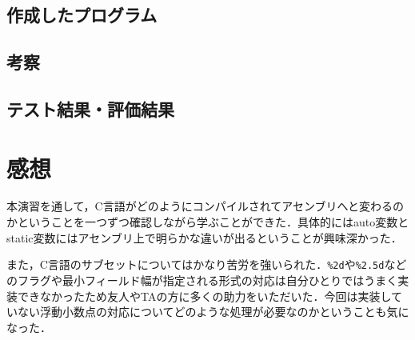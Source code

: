 \documentclass[a4j,11pt]{jarticle}
\begin{document}
  \subsection{作成したプログラム}
  \subsection{考察}
  \subsection{テスト結果・評価結果}

\section{感想}
本演習を通して，C言語がどのようにコンパイルされてアセンブリへと変わるのかということを一つずつ確認しながら学ぶことができた．具体的にはauto変数とstatic変数にはアセンブリ上で明らかな違いが出るということが興味深かった．

また，C言語のサブセットについてはかなり苦労を強いられた．\verb|%2d|や\verb|%2.5d|などのフラグや最小フィールド幅が指定される形式の対応は自分ひとりではうまく実装できなかったため友人やTAの方に多くの助力をいただいた．今回は実装していない浮動小数点の対応についてどのような処理が必要なのかということも気になった．
\end{document}
